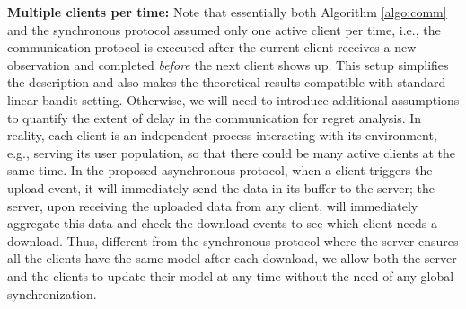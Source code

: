 \noindent \textbf{Multiple clients per time:}
Note that essentially both Algorithm \ref{algo:comm} and the synchronous protocol assumed only one active client per time, i.e., the communication protocol is executed after the current client receives a new observation and completed \textit{before} the next client shows up. 
This setup simplifies the description and also makes the theoretical results compatible with standard linear bandit setting. Otherwise, we will need to introduce additional assumptions to quantify the extent of delay in the communication for regret analysis.
In reality, each client is an independent process interacting with its environment, e.g., serving its user population, so that there could be many active clients at the same time. In the proposed asynchronous protocol, when a client triggers the upload event, it will immediately send the data in its buffer to the server; the server, upon receiving the uploaded data from any client, will immediately aggregate this data and check the download events to see which client needs a download. Thus, different from the synchronous protocol where the server ensures all the clients have the same model after each download, we allow both the server and the clients to update their model at any time without the need of any global synchronization.



